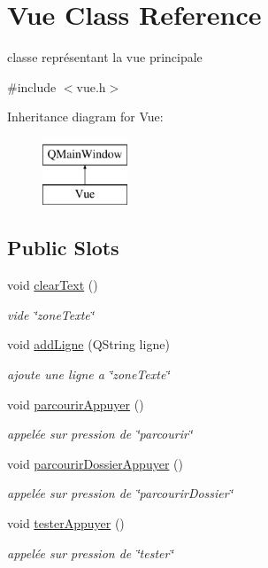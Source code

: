 \hypertarget{class_vue}{\section{Vue Class Reference}
\label{class_vue}
}


classe représentant la vue principale  




{\ttfamily \#include $<$vue.\-h$>$}

Inheritance diagram for Vue\-:\begin{figure}[H]
\begin{center}
\leavevmode
\includegraphics[height=2.000000cm]{class_vue}
\end{center}
\end{figure}
\subsection*{Public Slots}
\begin{DoxyCompactItemize}
\item 
void \hyperlink{class_vue_a70c0db80a2d27eb8097642b46e97f2d5}{clear\-Text} ()
\begin{DoxyCompactList}\small\item\em vide \char`\"{}zone\-Texte\char`\"{} \end{DoxyCompactList}\item 
void \hyperlink{class_vue_a71ae3f141fca897300185b8c2f9cc5c4}{add\-Ligne} (Q\-String ligne)
\begin{DoxyCompactList}\small\item\em ajoute une ligne a \char`\"{}zone\-Texte\char`\"{} \end{DoxyCompactList}\item 
void \hyperlink{class_vue_a8072d6b6002989f8d4c76d51b63468e0}{parcourir\-Appuyer} ()
\begin{DoxyCompactList}\small\item\em appelée sur pression de \char`\"{}parcourir\char`\"{} \end{DoxyCompactList}\item 
void \hyperlink{class_vue_ad3d78f8e2ad89c29c9a1e0c4588ae4ed}{parcourir\-Dossier\-Appuyer} ()
\begin{DoxyCompactList}\small\item\em appelée sur pression de \char`\"{}parcourir\-Dossier\char`\"{} \end{DoxyCompactList}\item 
void \hyperlink{class_vue_a7fb0d20950a6596a3eef78e244628682}{tester\-Appuyer} ()
\begin{DoxyCompactList}\small\item\em appelée sur pression de \char`\"{}tester\char`\"{} \end{DoxyCompactList}\end{DoxyCompactItemize}
